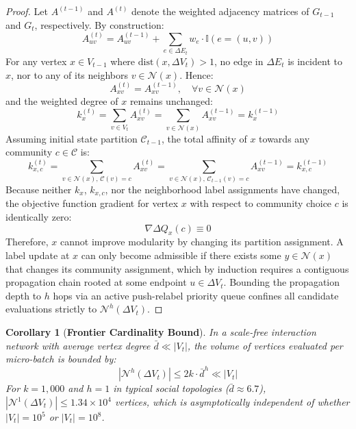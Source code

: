 \documentclass[10pt,journal,compsoc]{IEEEtran}
\newtheorem{corollary}{Corollary}
\begin{document}
\begin{proof}
Let $A^{(t-1)}$ and $A^{(t)}$ denote the weighted adjacency matrices of $G_{t-1}$ and $G_t$, respectively. By construction:
\begin{equation}
A_{uv}^{(t)} = A_{uv}^{(t-1)} + \sum_{e \in \Delta E_t} w_e \cdot \mathbb{I}(e = (u, v))
\end{equation}
For any vertex $x \in V_{t-1}$ where $\text{dist}(x, \Delta V_t) > 1$, no edge in $\Delta E_t$ is incident to $x$, nor to any of its neighbors $v \in \mathcal{N}(x)$. Hence:
\begin{equation}
A_{xv}^{(t)} = A_{xv}^{(t-1)}, \quad \forall v \in \mathcal{N}(x)
\end{equation}
and the weighted degree of $x$ remains unchanged:
\begin{equation}
k_x^{(t)} = \sum_{v \in V_t} A_{xv}^{(t)} = \sum_{v \in \mathcal{N}(x)} A_{xv}^{(t-1)} = k_x^{(t-1)}
\end{equation}
Assuming initial state partition $\mathcal{C}_{t-1}$, the total affinity of $x$ towards any community $c \in \mathcal{C}$ is:
\begin{equation}
k_{x, c}^{(t)} = \sum_{v \in \mathcal{N}(x),\, \mathcal{C}(v) = c} A_{xv}^{(t)} = \sum_{v \in \mathcal{N}(x),\, \mathcal{C}_{t-1}(v) = c} A_{xv}^{(t-1)} = k_{x, c}^{(t-1)}
\end{equation}
Because neither $k_x$, $k_{x, c}$, nor the neighborhood label assignments have changed, the objective function gradient for vertex $x$ with respect to community choice $c$ is identically zero:
\begin{equation}
\nabla \Delta Q_x(c) \equiv 0
\end{equation}
Therefore, $x$ cannot improve modularity by changing its partition assignment. A label update at $x$ can only become admissible if there exists some $y \in \mathcal{N}(x)$ that changes its community assignment, which by induction requires a contiguous propagation chain rooted at some endpoint $u \in \Delta V_t$. Bounding the propagation depth to $h$ hops via an active push-relabel priority queue confines all candidate evaluations strictly to $\mathcal{N}^h(\Delta V_t)$.
\end{proof}

\begin{corollary}[\textbf{Frontier Cardinality Bound}]
In a scale-free interaction network with average vertex degree $\bar{d} \ll |V_t|$, the volume of vertices evaluated per micro-batch is bounded by:
\begin{equation}
|\mathcal{N}^h(\Delta V_t)| \le 2k \cdot \bar{d}^h \ll |V_t|
\end{equation}
For $k = 1,000$ and $h = 1$ in typical social topologies ($\bar{d} \approx 6.7$), $|\mathcal{N}^1(\Delta V_t)| \le 1.34 \times 10^4$ vertices, which is asymptotically independent of whether $|V_t| = 10^5$ or $|V_t| = 10^8$.
\end{corollary}
\end{document}
